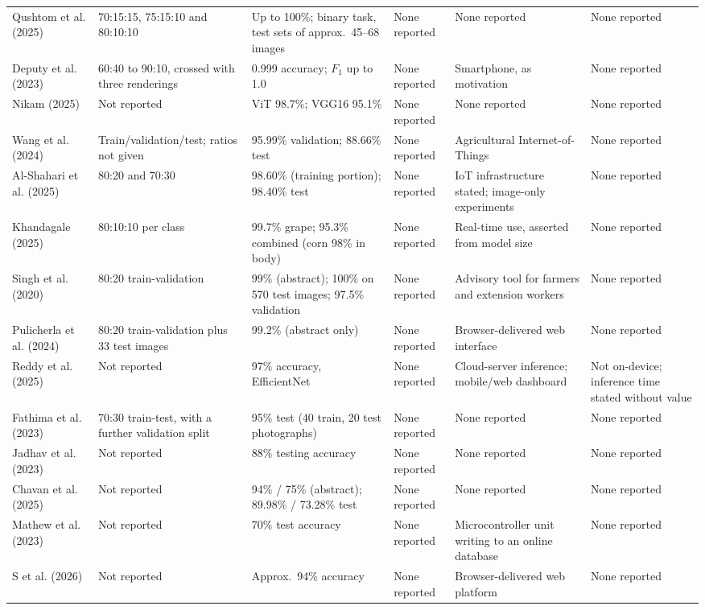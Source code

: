 {\begin{longtable}{L{58pt} L{66pt} L{60pt} L{50pt} L{54pt} L{56pt}}
Qushtom et al. (2025) & 70:15:15, 75:15:10 and 80:10:10 & Up to 100\%; binary task, test sets of approx.\ 45--68 images & None reported & None reported & None reported \\
Deputy et al. (2023) & 60:40 to 90:10, crossed with three renderings & 0.999 accuracy; $F_1$ up to 1.0 & None reported & Smartphone, as motivation & None reported \\
Nikam (2025) & Not reported & ViT 98.7\%; VGG16 95.1\% & None reported & None reported & None reported \\
Wang et al. (2024) & Train/validation/test; ratios not given & 95.99\% validation; 88.66\% test & None reported & Agricultural Internet-of-Things & None reported \\
Al-Shahari et al. (2025) & 80:20 and 70:30 & 98.60\% (training portion); 98.40\% test & None reported & IoT infrastructure stated; image-only experiments & None reported \\
Khandagale (2025) & 80:10:10 per class & 99.7\% grape; 95.3\% combined (corn 98\% in body) & None reported & Real-time use, asserted from model size & None reported \\
Singh et al. (2020) & 80:20 train-validation & 99\% (abstract); 100\% on 570 test images; 97.5\% validation & None reported & Advisory tool for farmers and extension workers & None reported \\
Pulicherla et al. (2024) & 80:20 train-validation plus 33 test images & 99.2\% (abstract only) & None reported & Browser-delivered web interface & None reported \\
Reddy et al. (2025) & Not reported & 97\% accuracy, EfficientNet & None reported & Cloud-server inference; mobile/web dashboard & Not on-device; inference time stated without value \\
Fathima et al. (2023) & 70:30 train-test, with a further validation split & 95\% test (40 train, 20 test photographs) & None reported & None reported & None reported \\
Jadhav et al. (2023) & Not reported & 88\% testing accuracy & None reported & None reported & None reported \\
Chavan et al. (2025) & Not reported & 94\% / 75\% (abstract); 89.98\% / 73.28\% test & None reported & None reported & None reported \\
Mathew et al. (2023) & Not reported & 70\% test accuracy & None reported & Microcontroller unit writing to an online database & None reported \\
S et al. (2026) & Not reported & Approx.\ 94\% accuracy & None reported & Browser-delivered web platform & None reported \\

\end{longtable}}

